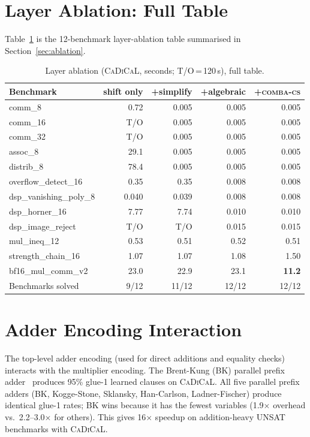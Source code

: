 \documentclass[a4paper]{ceurart}
\newcommand{\combacs}{\textsc{comba-cs}\xspace}
\newcommand{\cadical}{\textsc{CaDiCaL}\xspace}
\begin{document}
\section{Layer Ablation: Full Table}
\label{app:layer-full}

Table~\ref{tab:ablation-full} is the 12-benchmark layer-ablation
table summarised in Section~\ref{sec:ablation}.

\begin{table}[ht]
\caption{Layer ablation (\cadical, seconds; T/O\,=\,120\,s), full
  table.}
\label{tab:ablation-full}
\centering
\small
\begin{tabular}{lrrrr}
\toprule
Benchmark & shift only & +simplify & +algebraic & +\combacs \\
\midrule
comm\_8 & 0.72 & 0.005 & 0.005 & 0.005 \\
comm\_16 & T/O & 0.005 & 0.005 & 0.005 \\
comm\_32 & T/O & 0.005 & 0.005 & 0.005 \\
assoc\_8 & 29.1 & 0.005 & 0.005 & 0.005 \\
distrib\_8 & 78.4 & 0.005 & 0.005 & 0.005 \\
overflow\_detect\_16 & 0.35 & 0.35 & 0.008 & 0.008 \\
dsp\_vanishing\_poly\_8 & 0.040 & 0.039 & 0.008 & 0.008 \\
dsp\_horner\_16 & 7.77 & 7.74 & 0.010 & 0.010 \\
dsp\_image\_reject & T/O & T/O & 0.015 & 0.015 \\
mul\_ineq\_12 & 0.53 & 0.51 & 0.52 & 0.51 \\
strength\_chain\_16 & 1.07 & 1.07 & 1.08 & 1.50 \\
bf16\_mul\_comm\_v2 & 23.0 & 22.9 & 23.1 & \textbf{11.2} \\
\midrule
Benchmarks solved & 9/12 & 11/12 & 12/12 & 12/12 \\
\bottomrule
\end{tabular}
\end{table}


\section{Adder Encoding Interaction}
\label{app:adders}

The top-level adder encoding (used for direct additions and equality
checks) interacts with the multiplier encoding. The Brent-Kung (BK)
parallel prefix adder~\cite{brent1982regular} produces 95\% glue-1
learned clauses on \cadical. All five parallel prefix adders (BK,
Kogge-Stone, Sklansky, Han-Carlson, Ladner-Fischer) produce identical
glue-1 rates; BK wins because it has the fewest variables
(1.9$\times$ overhead vs.\ 2.2--3.0$\times$ for others). This gives
16$\times$ speedup on addition-heavy UNSAT benchmarks with \cadical.
\end{document}
